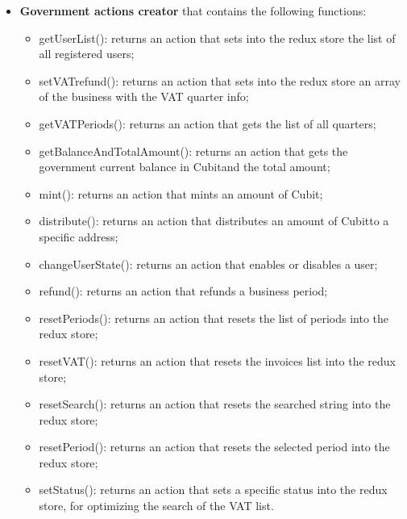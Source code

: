 \begin{itemize}
\begin{itemize}
	\end{itemize}
	\item \textbf{Government actions creator} that contains the following functions:
	\begin{itemize}
		\item getUserList(): returns an action that sets into the redux store the list of all registered users;
		\item setVATrefund(): returns an action that sets into the redux store an array of the business with the VAT quarter info;
		\item getVATPeriods(): returns an action that gets the list of all quarters;
		\item getBalanceAndTotalAmount(): returns an action that gets the government current balance in Cubit\glosp and the total amount;
		\item mint(): returns an action that mints an amount of Cubit\glo;
		\item distribute(): returns an action that distributes an amount of Cubit\glosp to a specific address;
		\item changeUserState(): returns an action that enables or disables a user;
		\item refund(): returns an action that refunds a business period;
		\item resetPeriods(): returns an action that resets the list of periods into the redux store;
		\item resetVAT(): returns an action that resets the invoices list into the redux store;
		\item resetSearch(): returns an action that resets the searched string into the redux store;
		\item resetPeriod(): returns an action that resets the selected period into the redux store;
		\item setStatus(): returns an action that sets a specific status into the redux store, for optimizing the search of the VAT list.
	\end{itemize}
\end{itemize}
